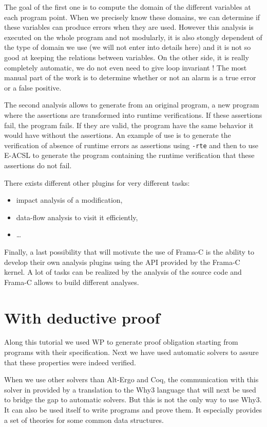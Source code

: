 \documentclass[12pt,francais,]{scrbook}
\providecommand{\tightlist}{%
  \setlength{\itemsep}{0pt}\setlength{\parskip}{0pt}}
\begin{document}
The goal of the first one is to compute the domain of the different
variables at each program point. When we precisely know these domains,
we can determine if these variables can produce errors when they are
used. However this analysis is executed on the whole program and not
modularly, it is also stongly dependent of the type of domain we use (we
will not enter into details here) and it is not so good at keeping the
relations between variables. On the other side, it is really completely
automatic, we do not even need to give loop invariant ! The most manual
part of the work is to determine whether or not an alarm is a true error
or a false positive.

The second analysis allows to generate from an original program, a new
program where the assertions are transformed into runtime verifications.
If these assertions fail, the program fails. If they are valid, the
program have the same behavior it would have without the assertions. An
example of use is to generate the verification of absence of runtime
errors as assertions using \texttt{-rte} and then to use E-ACSL to
generate the program containing the runtime verification that these
assertions do not fail.

There exists different other plugins for very different tasks:

\begin{itemize}
\tightlist
\item
  impact analysis of a modification,
\item
  data-flow analysis to visit it efficiently,
\item
  \ldots{}
\end{itemize}

Finally, a last possibility that will motivate the use of Frama-C is the
ability to develop their own analysis plugins using the API provided by
the Frama-C kernel. A lot of tasks can be realized by the analysis of
the source code and Frama-C allows to build different analyses.

\section{With deductive proof}\label{with-deductive-proof}

Along this tutorial we used WP to generate proof obligation starting
from programs with their specification. Next we have used automatic
solvers to assure that these properties were indeed verified.

When we use other solvers than Alt-Ergo and Coq, the communication with
this solver in provided by a translation to the Why3 language that will
next be used to bridge the gap to automatic solvers. But this is not the
only way to use Why3. It can also be used itself to write programs and
prove them. It especially provides a set of theories for some common
data structures.
\end{document}
